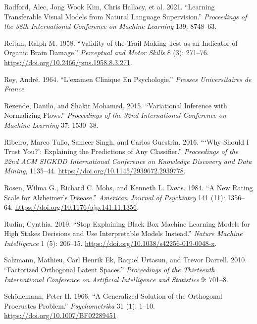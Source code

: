 \documentclass[
  10pt,
  letterpaper,
]{report}
\newlength{\cslhangindent}
\newenvironment{CSLReferences}[2] %
 {\begin{list}{}{%
  \setlength{\itemindent}{0pt}
  \setlength{\leftmargin}{0pt}
  \setlength{\parsep}{0pt}
  \ifodd #1
   \setlength{\leftmargin}{\cslhangindent}
   \setlength{\itemindent}{-1\cslhangindent}
  \fi
  \setlength{\itemsep}{#2\baselineskip}}}
 {\end{list}}
\begin{document}
\begin{CSLReferences}{1}{1}
{Radford, Alec, Jong Wook Kim, Chris Hallacy, et al.} 2021. {``Learning
Transferable Visual Models from Natural Language Supervision.''}
\emph{Proceedings of the 38th International Conference on Machine
Learning} 139: 8748--63.

Reitan, Ralph M. 1958. {``Validity of the {Trail Making Test} as an
Indicator of Organic Brain Damage.''} \emph{Perceptual and Motor Skills}
8 (3): 271--76. \url{https://doi.org/10.2466/pms.1958.8.3.271}.

Rey, André. 1964. {``L'examen Clinique En Psychologie.''} \emph{Presses
Universitaires de France}.

Rezende, Danilo, and Shakir Mohamed. 2015. {``Variational Inference with
Normalizing Flows.''} \emph{Proceedings of the 32nd International
Conference on Machine Learning} 37: 1530--38.

Ribeiro, Marco Tulio, Sameer Singh, and Carlos Guestrin. 2016. {``{`Why
Should {I} Trust You?'}: Explaining the Predictions of Any
Classifier.''} \emph{Proceedings of the 22nd ACM SIGKDD International
Conference on Knowledge Discovery and Data Mining}, 1135--44.
\url{https://doi.org/10.1145/2939672.2939778}.

Rosen, Wilma G., Richard C. Mohs, and Kenneth L. Davis. 1984. {``A New
Rating Scale for {Alzheimer's} Disease.''} \emph{American Journal of
Psychiatry} 141 (11): 1356--64.
\url{https://doi.org/10.1176/ajp.141.11.1356}.

Rudin, Cynthia. 2019. {``Stop Explaining Black Box Machine Learning
Models for High Stakes Decisions and Use Interpretable Models
Instead.''} \emph{Nature Machine Intelligence} 1 (5): 206--15.
\url{https://doi.org/10.1038/s42256-019-0048-x}.

Salzmann, Mathieu, Carl Henrik Ek, Raquel Urtasun, and Trevor Darrell.
2010. {``Factorized Orthogonal Latent Spaces.''} \emph{Proceedings of
the Thirteenth International Conference on Artificial Intelligence and
Statistics} 9: 701--8.

Schönemann, Peter H. 1966. {``A Generalized Solution of the Orthogonal
{Procrustes} Problem.''} \emph{Psychometrika} 31 (1): 1--10.
\url{https://doi.org/10.1007/BF02289451}.


\end{CSLReferences}
\end{document}
